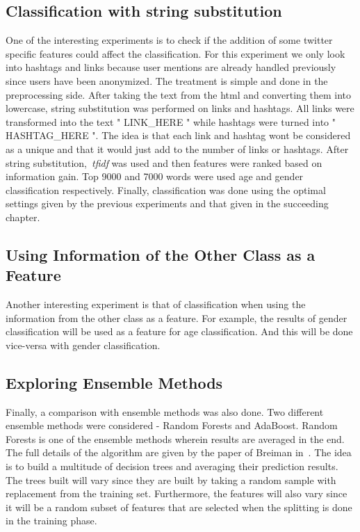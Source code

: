 \documentclass[a4paper]{llncs}
\begin{document}
\subsection{Classification with string substitution}
One of the interesting experiments is to check if the addition of some twitter specific features could affect the classification. For this experiment we only look into hashtags and links because user mentions are already handled previously since users have been anonymized. The treatment is simple and done in the preprocessing side. After taking the text from the html and converting them into lowercase, string substitution was performed on links and hashtags. All links were transformed into the text " LINK\_HERE " while hashtags were turned into " HASHTAG\_HERE ". The idea is that each link and hashtag wont be considered as a unique and that it would just add to the number of links or hashtags. After string substitution,~\textit{tfidf} was used and then features were ranked based on information gain. Top 9000 and 7000 words were used age and gender classification respectively. Finally, classification was done using the optimal settings given by the previous experiments and that given in the succeeding chapter. 


\subsection{Using Information of the Other Class as a Feature}
Another interesting experiment is that of classification when using the information from the other class as a feature. For example, the results of gender classification will be used as a feature for age classification. And this will be done vice-versa with gender classification.  


\subsection{Exploring Ensemble Methods}
Finally, a comparison with ensemble methods was also done. Two different ensemble methods were considered - Random Forests and AdaBoost. Random Forests is one of the ensemble methods wherein results are averaged in the end. The full details of the algorithm are given by the paper of Breiman in~\cite{breiman2001random}. The idea is to build a multitude of decision trees and averaging their prediction results. The trees built will vary since they are built by taking a random sample with replacement from the training set. Furthermore, the features will also vary since it will be a random subset of features that are selected when the splitting is done in the training phase. 
\end{document}
